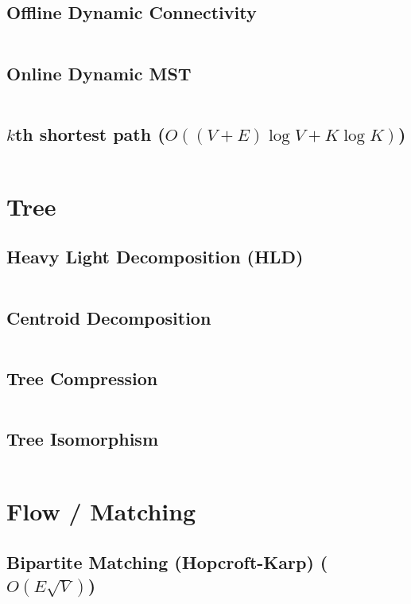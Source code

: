 \documentclass[8pt, a4paper, oneside]{extarticle}
\begin{document}
\begin{multicols*}{2}
\subsection{Offline Dynamic Connectivity}
\inputminted{c++}{codes/graph/offline_dynamic_connectivity.cpp}

\subsection{Online Dynamic MST}
\inputminted{c++}{codes/graph/online_dynamic_mst.cpp}

\subsection{$k$th shortest path ($O((V+E) \log V + K \log K)$)}
\inputminted{c++}{codes/graph/kth_shortest_path.cpp}

\section{Tree}
\subsection{Heavy Light Decomposition (HLD)}
\inputminted{c++}{codes/tree/hld.cpp}

\subsection{Centroid Decomposition}
\inputminted{c++}{codes/tree/centroid_decomposition.cpp}

\subsection{Tree Compression}
\inputminted{c++}{codes/tree/tree_compression.cpp}

\subsection{Tree Isomorphism}
\inputminted{c++}{codes/tree/tree_isomorphism.cpp}

\section{Flow / Matching}
\subsection{Bipartite Matching (Hopcroft-Karp) ($O(E \sqrt V)$)}
\inputminted{c++}{codes/flow_matching/hopcroft_karp.cpp}


\end{multicols*}
\end{document}
